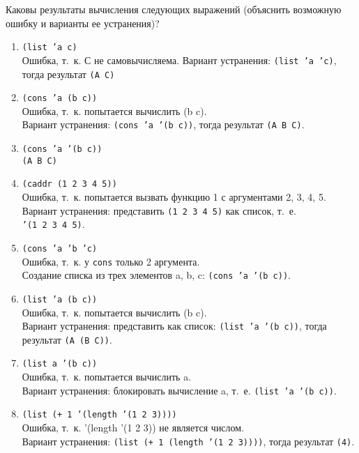 Каковы результаты вычисления следующих выражений (объяснить возможную ошибку и варианты ее устранения)?
\begin{enumerate}
	\item \texttt{(list 'a c)}
	\\ Ошибка, т.~к. С не самовычисляема. Вариант устранения: \texttt{(list 'a 'c)}, тогда результат \texttt{(A C)}
	
	\item \texttt{(cons 'a (b c))}
	\\ Ошибка, т.~к. попытается вычислить (b c). 
	\\ Вариант устранения: \texttt{(cons~'a~'(b c))}, тогда результат \texttt{(A B C)}.
	
	\item \texttt{(cons 'a '(b c))}	
	\\ \texttt{(A B C)}
	
	\item \texttt{(caddr (1 2 3 4 5))}
	\\ Ошибка, т.~к. попытается вызвать функцию 1 с аргументами 2, 3, 4, 5.
	\\ Вариант устранения: представить \texttt{(1 2 3 4 5)} как список, т.~е. \texttt{'(1~2~3~4~5)}.
	
	\item \texttt{(cons 'a 'b 'c)}
	\\ Ошибка, т.~к. у \texttt{cons} только 2 аргумента.
	\\ Создание списка из трех элементов a, b, c: \texttt{(cons 'a '(b c))}.
	
	\item \texttt{(list 'a (b c))}
	\\ Ошибка, т.~к. попытается вычислить (b c).
	\\ Вариант устранения: представить как список: \texttt{(list 'a '(b c))}, тогда результат \texttt{(A (B C))}.
	
	\item \texttt{(list a '(b c))}
	\\ Ошибка, т.~к. попытается вычислить a.
	\\ Вариант устранения: блокировать вычисление a, т.~е. \texttt{(list 'a '(b c))}.
	
	\item \texttt{(list (+ 1 '(length '(1 2 3))))}
	\\ Ошибка, т.~к. '(length '(1 2 3)) не является числом.
	\\ Вариант устранения: \texttt{(list (+ 1 (length '(1 2 3))))}, тогда результат \texttt{(4)}.
\end{enumerate}

